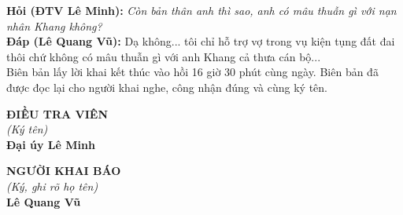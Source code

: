 \documentclass[12pt,a4paper]{article}
\begin{document}
\noindent\textbf{Hỏi (ĐTV Lê Minh):} \textit{Còn bản thân anh thì sao, anh có mâu thuẫn gì với nạn nhân Khang không?}\\[0.15cm]
\noindent\textbf{Đáp (Lê Quang Vũ):} Dạ không... tôi chỉ hỗ trợ vợ trong vụ kiện tụng đất đai thôi chứ không có mâu thuẫn gì với anh Khang cả thưa cán bộ...\\[0.35cm]


Biên bản lấy lời khai kết thúc vào hồi 16 giờ 30 phút cùng ngày. Biên bản đã được đọc lại cho người khai nghe, công nhận đúng và cùng ký tên.

\vspace{0.8cm}
\noindent
\begin{minipage}[t]{0.48\textwidth}
    \begin{center}
        \textbf{ĐIỀU TRA VIÊN}\\[0.1cm]
        \textit{(Ký tên)}\\[1.6cm]
        \textbf{Đại úy Lê Minh}
    \end{center}
\end{minipage}
\hfill
\begin{minipage}[t]{0.48\textwidth}
    \begin{center}
        \textbf{NGƯỜI KHAI BÁO}\\[0.1cm]
        \textit{(Ký, ghi rõ họ tên)}\\[1.6cm]
        \textbf{Lê Quang Vũ}
    \end{center}
\end{minipage}
\end{document}
